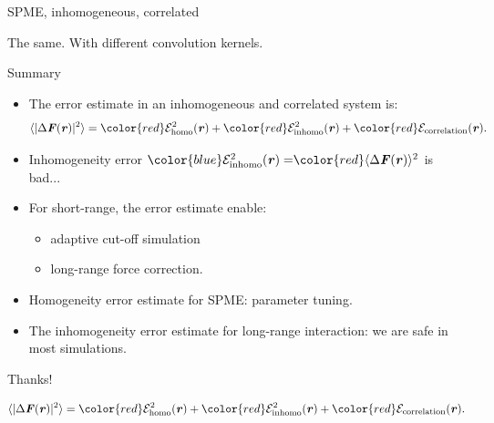 \documentclass{beamer}
\newcommand{\redc}[1]{{\color{red} #1}}
\newcommand{\bluec}[1]{{\color{blue} #1}}
\renewcommand{\v}[1]{\textbf{\textit{#1}}}
\begin{document}
\begin{frame}{SPME, inhomogeneous, correlated}
  \centerline{
    The \redc{same}. With different convolution kernels.}
\end{frame}

\begin{frame}{Summary}
  \begin{itemize}\itemsep -10pt
  \item<1-> The error estimate in an inhomogeneous and correlated system is:
    \bluec{
      \begin{align*} \nonumber
        \langle\vert\Delta\v F(\v r)\vert^2\rangle
        = 
        \redc{\mathcal E^2_{\textrm{homo}}(\v r)} +
        \redc{\mathcal E^2_{\textrm{inhomo}}(\v r)} +
        \redc{\mathcal E_{\textrm{correlation}}(\v r)}.
      \end{align*}
    }
  \item<2-> Inhomogeneity error $ \bluec{\mathcal E^2_{\textrm{inhomo}}(\v
      r) = }\redc{\langle\Delta\v F(\v r)\rangle^2}$ is bad...
    \vfill
  \item<3-> For short-range, the error estimate enable:
    \begin{itemize}
    \item \redc{adaptive cut-off simulation} 
    \item \redc{long-range force correction}.
    \end{itemize}
    \vfill
  \item<4-> Homogeneity error estimate for SPME: \redc{parameter tuning}.
    \vfill
  \item<5-> The inhomogeneity error estimate for long-range interaction:
    we are \redc{safe} in most simulations.
    \vfill
  \end{itemize}
\end{frame}


\begin{frame}
  \vfill
  \centerline{ \Huge
    Thanks!  }
  \vfill
  \bluec{
    \begin{align*} \nonumber
      \langle\vert\Delta\v F(\v r)\vert^2\rangle
      = 
      \redc{\mathcal E^2_{\textrm{homo}}(\v r)} +
      \redc{\mathcal E^2_{\textrm{inhomo}}(\v r)} +
      \redc{\mathcal E_{\textrm{correlation}}(\v r)}.
    \end{align*}
  }
\end{frame}
\end{document}
